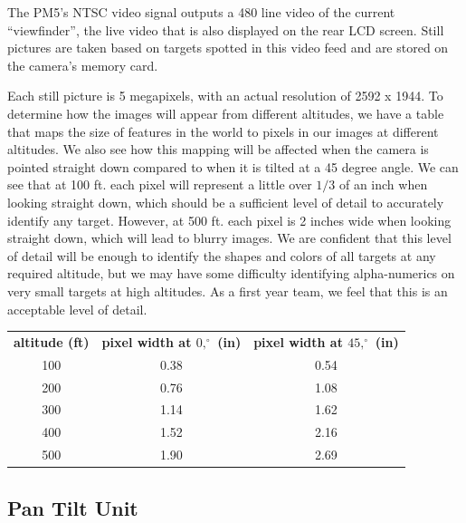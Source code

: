 \documentclass[10pt,twocolumns]{report}
\begin{document}

The PM5's NTSC video signal outputs a 480 line video of the current ``viewfinder'', the live video that is also displayed on the rear LCD screen. 
Still pictures are taken based on targets spotted in this video feed and are stored on the camera's memory card.

Each still picture is 5 megapixels, with an actual resolution of 2592 x 1944.  To determine how the images will appear from different altitudes, we have a table that maps the size of features in the world to pixels in our images at different altitudes.  We also see how this mapping will be affected when the camera is pointed straight down compared to when it is tilted at a 45 degree angle.  We can see that at 100 ft. each pixel will represent a little over $1/3$ of an inch when looking straight down, which should be a sufficient level of detail to accurately identify any target.  However, at 500 ft. each pixel is 2 inches wide when looking straight down, which will lead to blurry images.  We are confident that this level of detail will be enough to identify the shapes and colors of all targets at any required altitude, but we may have some difficulty identifying alpha-numerics on very small targets at high altitudes.  As a first year team, we feel that this is an acceptable level of detail.

\begin{tabular}{ccc}
{\bf altitude (ft)} & {\bf pixel width at $0,^{\circ}$ (in)} & {\bf pixel width at $45,^{\circ}$ (in)} \\
       100 &       0.38 &       0.54 \\
       200 &       0.76 &       1.08 \\
       300 &       1.14 &       1.62 \\
       400 &       1.52 &       2.16 \\
       500 &       1.90 &       2.69 \\
\end{tabular}


\subsection{Pan Tilt Unit}
\end{document}
